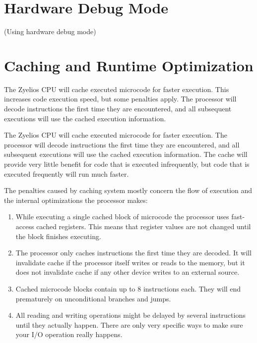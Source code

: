 \section{Hardware Debug Mode}
(Using hardware debug mode)

\section{Caching and Runtime Optimization} \label{caching}
The Zyelios CPU will cache executed microcode for faster execution. This increases code execution speed, but some penalties apply. The processor will decode instructions the first time they are encountered, and all subsequent executions will use the cached execution information.

The Zyelios CPU will cache executed microcode for faster execution. The processor will decode instructions the first time they are encountered, and all subsequent executions will use the cached execution information. The cache will provide very little benefit for code that is executed infrequently, but code that is executed frequently will run much faster.

The penalties caused by caching system mostly concern the flow of execution and the internal optimizations the processor makes:
\begin{enumerate}
	\item While executing a single cached block of microcode the processor uses fast-access cached registers. This means that register values are not changed until the block finishes executing.
	\item The processor only caches instructions the first time they are decoded. It will invalidate cache if the processor itself writes or reads to the memory, but it does not invalidate cache if any other device writes to an external source.
	\item Cached microcode blocks contain up to 8 instructions each. They will end prematurely on unconditional branches and jumps.
	\item All reading and writing operations might be delayed by several instructions until they actually happen. There are only very specific ways to make sure your I/O operation really happens.
\end{enumerate}

